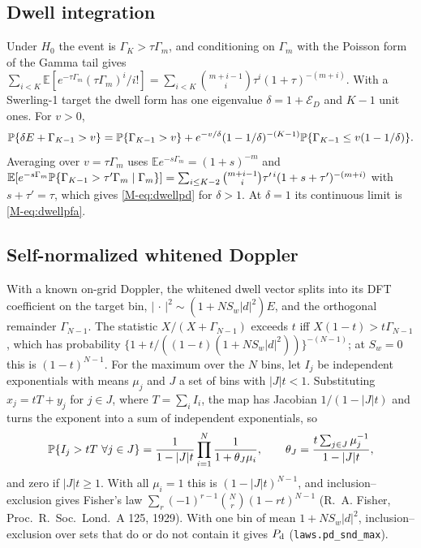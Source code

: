 \subsection{Dwell integration}
Under $H_0$ the event is $\Gamma_K>\tau\Gamma_m$, and conditioning on $\Gamma_m$ with the Poisson form of the Gamma tail gives $\sum_{i<K}\mathbb E[e^{-\tau\Gamma_m}(\tau\Gamma_m)^i/i!]=\sum_{i<K}\binom{m+i-1}{i}\tau^i(1+\tau)^{-(m+i)}$. With a Swerling-1 target the dwell form has one eigenvalue $\delta=1+\mathcal E_D$ and $K-1$ unit ones. For $v>0$,
\[
\mathbb{P}\{\delta E+\Gamma_{K-1}>v\}=\mathbb{P}\{\Gamma_{K-1}>v\}+e^{-v/\delta}(1-1/\delta)^{-(K-1)}\mathbb{P}\{\Gamma_{K-1}\le v(1-1/\delta)\}.
\]
Averaging over $v=\tau\Gamma_m$ uses $\mathbb E e^{-s\Gamma_m}=(1+s)^{-m}$ and $\mathbb E[e^{-s\Gamma_m}\mathbb{P}\{\Gamma_{K-1}>\tau'\Gamma_m\mid\Gamma_m\}]=\sum_{i\le K-2}\binom{m+i-1}{i}\tau'^{\,i}(1+s+\tau')^{-(m+i)}$ with $s+\tau'=\tau$, which gives \eqref{M-eq:dwellpd} for $\delta>1$. At $\delta=1$ its continuous limit is \eqref{M-eq:dwellpfa}.

\subsection{Self-normalized whitened Doppler}
With a known on-grid Doppler, the whitened dwell vector splits into its DFT coefficient on the target bin, $|\,\cdot\,|^2\sim(1+NS_w|d|^2)E$, and the orthogonal remainder $\Gamma_{N-1}$. The statistic $X/(X+\Gamma_{N-1})$ exceeds $t$ iff $X(1-t)>t\Gamma_{N-1}$, which has probability $\{1+t/((1-t)(1+NS_w|d|^2))\}^{-(N-1)}$; at $S_w=0$ this is $(1-t)^{N-1}$. For the maximum over the $N$ bins, let $I_j$ be independent exponentials with means $\mu_j$ and $J$ a set of bins with $|J|t<1$. Substituting $x_j=tT+y_j$ for $j\in J$, where $T=\sum_iI_i$, the map has Jacobian $1/(1-|J|t)$ and turns the exponent into a sum of independent exponentials, so
\[
\mathbb{P}\{I_j>tT\ \forall j\in J\}=\frac{1}{1-|J|t}\prod_{i=1}^N\frac{1}{1+\theta_J\mu_i},\qquad\theta_J=\frac{t\sum_{j\in J}\mu_j^{-1}}{1-|J|t},
\]
and zero if $|J|t\ge1$. With all $\mu_i=1$ this is $(1-|J|t)^{N-1}$, and inclusion–exclusion gives Fisher's law $\sum_r(-1)^{r-1}\binom Nr(1-rt)^{N-1}$ (R.~A. Fisher, Proc.\ R.\ Soc.\ Lond.\ A 125, 1929). With one bin of mean $1+NS_w|d|^2$, inclusion–exclusion over sets that do or do not contain it gives $P_{\rm d}$ (\texttt{laws.pd\_snd\_max}).

